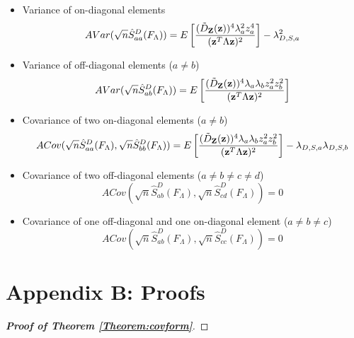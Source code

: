 \documentclass[fleqn,12pt]{article}
\begin{document}
\begin{itemize}
\item Variance of on-diagonal elements
$$ AVar( \sqrt n \hat S^D_{aa} (F_\Lambda)) = E \left[ \frac{(\tilde D_{\mathbf{Z}} ({\bf{z}}))^4 \lambda_a^2 z_a^4}{({\bf{z}}^T \Lambda {\bf{z}})^2} \right] - \lambda_{D,S,a}^2 $$

\item Variance of off-diagonal elements ($a \neq b$)
$$ AVar( \sqrt n \hat S^D_{ab} (F_\Lambda)) = E \left[ \frac{(\tilde D_{\mathbf{Z}} ({\bf{z}}))^4 \lambda_a \lambda_b z_a^2 z_b^2}{({\bf{z}}^T \Lambda {\bf{z}})^2} \right] $$

\item Covariance of two on-diagonal elements ($a \neq b$)
$$ ACov(\sqrt n \hat S^D_{aa} (F_\Lambda), \sqrt n \hat S^D_{bb} (F_\Lambda))
= E \left[ \frac{(\tilde D_{\mathbf{Z}} ({\bf{z}}))^4 \lambda_a \lambda_b z_a^2 z_b^2}{({\bf{z}}^T \Lambda {\bf{z}})^2} \right] - \lambda_{D,S,a} \lambda_{D,S,b} $$

\item Covariance of two off-diagonal elements ($a \neq b \neq c \neq d$)
$$ ACov(\sqrt n \hat S^D_{ab} (F_\Lambda), \sqrt n \hat S^D_{cd} (F_\Lambda)) = 0 $$

\item Covariance of one off-diagonal and one on-diagonal element ($a \neq b \neq c$)
$$ ACov(\sqrt n \hat S^D_{ab} (F_\Lambda), \sqrt n \hat S^D_{cc} (F_\Lambda)) = 0 $$
\end{itemize}

\section*{Appendix B: Proofs}
\begin{proof}[\textbf{Proof of Theorem  \ref{Theorem:covform}}]

\end{proof}
\end{document}
